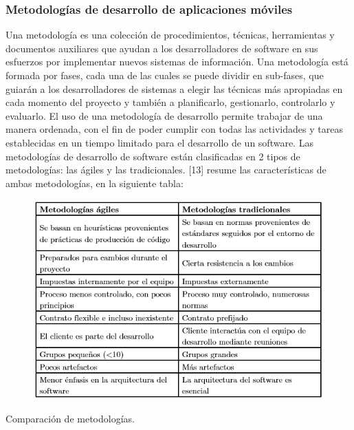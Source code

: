 \documentclass[12pt,letterpaper,openany]{book}
\begin{document}
\subsubsection{Metodologías de desarrollo de aplicaciones móviles}
Una metodología es una colección de procedimientos, técnicas, herramientas y documentos auxiliares que ayudan a los desarrolladores de software en sus esfuerzos por implementar nuevos sistemas de información. Una metodología está formada por fases, cada una de las cuales se puede dividir en sub-fases, que guiarán a los desarrolladores de sistemas a elegir las técnicas más apropiadas en cada momento del proyecto y también a planificarlo, gestionarlo, controlarlo y evaluarlo.
\vspace{5mm}\newline
El uso de una metodología de desarrollo permite trabajar de una manera ordenada, con el fin de poder cumplir con todas las actividades y tareas establecidas en un tiempo limitado para el desarrollo de un software. 
\vspace{5mm}\newline
Las metodologías de desarrollo de software están clasificadas en 2 tipos de metodologías: las ágiles y las tradicionales. [13] resume las características de ambas metodologías, en la siguiente tabla:

\begin{table}[H]
\begin{center}
\begin{figure}[H]
\begin{center}
\includegraphics[width=13cm]{./imagenes/tablas/comparacion_metodologias}
\end{center}
\end{figure}
\end{center}
\caption{Comparación de metodologías.}
\end{table}
\end{document}

